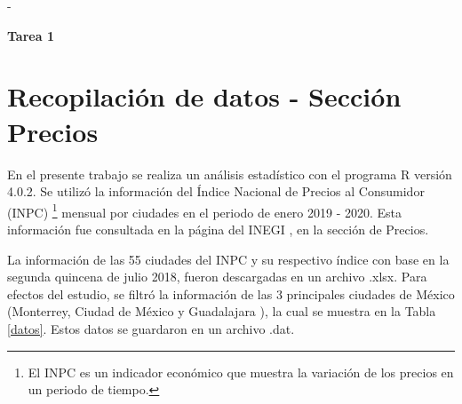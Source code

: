 \documentclass[fontsize=12pt]{article}
\begin{document}

\textcolor[rgb]{1,1,1}{-}
\begin{center}
\Large \textbf{Tarea 1}
\end{center}


\section{Recopilación de datos - Sección Precios} \label{recopdedatos}

En el presente trabajo se realiza un análisis estadístico con el programa R versión 4.0.2. Se utilizó la información del Índice Nacional de Precios al Consumidor (INPC) \footnote{El INPC es un indicador económico que muestra la variación de los precios en un periodo de tiempo.} mensual por ciudades en el periodo de enero 2019 - 2020. Esta información fue consultada en la página del INEGI \cite{INEGI}, en la sección de Precios.

La información de las 55 ciudades del INPC y su respectivo índice con base en la segunda quincena de julio 2018, fueron descargadas en un archivo .xlsx. Para efectos del estudio, se filtró la información de las 3 principales ciudades de México (Monterrey, Ciudad de México y Guadalajara ), la cual se muestra en la Tabla \ref{datos}. Estos datos se guardaron en un archivo .dat.
\end{document}
